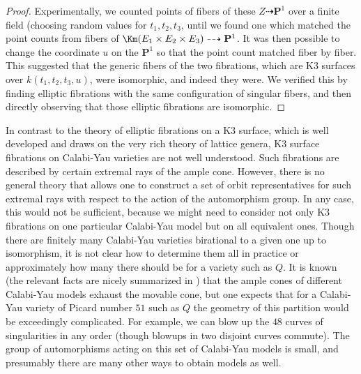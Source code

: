 \documentclass{article}
\def\P{\mathbf{P}}
\begin{document}
\begin{proof}
Experimentally, we counted points of fibers of these $Z\dashrightarrow \P^1$ over a finite field (choosing random values for $t_1,t_2,t_3$, until we found one which matched the point counts from fibers of $\Km(E_1\times E_2\times E_3)\dashrightarrow \P^1$.  It was then possible to change the coordinate $u$ on the $\P^1$ so that the point count matched fiber by fiber.  This suggested that the generic fibers of the two fibrations, which are K3 surfaces over $k(t_1,t_2,t_3,u)$, were isomorphic, and indeed they were.  We verified this by finding elliptic fibrations with the same configuration of singular fibers, and then directly observing that those elliptic fibrations are isomorphic.
\end{proof}

\begin{rmk}\label{rem:just-lucky}
  In contrast to the theory of elliptic fibrations on a K3 surface, which
  is well developed and draws on the very rich theory of lattice genera,
  K3 surface fibrations on Calabi-Yau varieties are not well understood.
  Such fibrations are described by certain extremal rays of the ample
  cone.  However, there is no general theory that allows one to construct a
  set of orbit representatives for such extremal rays with respect to the
  action of the automorphism group.  In any case, this would not be sufficient,
  because we might need to consider not only K3 fibrations on one particular
  Calabi-Yau model but on all equivalent ones.  Though there are finitely
  many Calabi-Yau varieties birational to a given one up to isomorphism,
  it is not clear how to determine them all in practice or approximately
  how many there should be for a variety such as $Q$.
  It is known (the relevant facts are nicely summarized in
  \cite[Introduction]{Fryers}) that the ample cones of different Calabi-Yau
  models exhaust the movable cone, but one expects that for a Calabi-Yau
  variety of Picard number $51$ such as $Q$ the geometry of this partition
  would be exceedingly complicated.  For example, we can blow up the $48$
  curves of singularities in any order (though blowups in two disjoint curves
  commute).  The group of automorphisms
  acting on this set of Calabi-Yau models is small,
  and presumably there are many other ways to obtain models as well.


\end{rmk}
\end{document}
